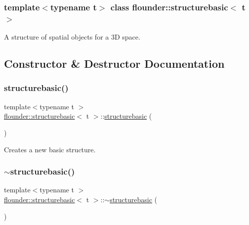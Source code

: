 \subsubsection*{template$<$typename t$>$\newline
class flounder\+::structurebasic$<$ t $>$}

A structure of spatial objects for a 3D space. 



\subsection{Constructor \& Destructor Documentation}
\mbox{\label{classflounder_1_1structurebasic_a4cdb10b77f632a140476bfd33da7cdd7}} 
\subsubsection{\texorpdfstring{structurebasic()}{structurebasic()}}
{\footnotesize\ttfamily template$<$typename t $>$ \\
\hyperlink{classflounder_1_1structurebasic}{flounder\+::structurebasic}$<$ t $>$\+::\hyperlink{classflounder_1_1structurebasic}{structurebasic} (\begin{DoxyParamCaption}{ }\end{DoxyParamCaption})}



Creates a new basic structure. 

\mbox{\label{classflounder_1_1structurebasic_a7ce24fc6a91e6a340d8526cc84b2f8ae}} 
\subsubsection{\texorpdfstring{$\sim$structurebasic()}{~structurebasic()}}
{\footnotesize\ttfamily template$<$typename t $>$ \\
\hyperlink{classflounder_1_1structurebasic}{flounder\+::structurebasic}$<$ t $>$\+::$\sim$\hyperlink{classflounder_1_1structurebasic}{structurebasic} (\begin{DoxyParamCaption}{ }\end{DoxyParamCaption})}




